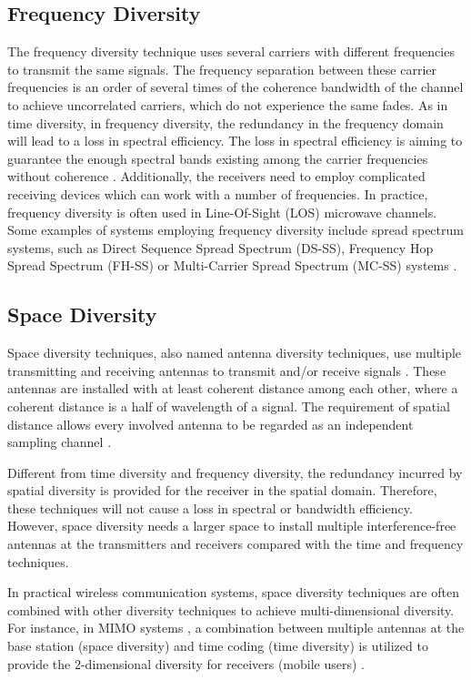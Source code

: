 \subsection{Frequency Diversity}
The frequency diversity technique uses several carriers with
different frequencies to transmit the same signals. The frequency
separation between these carrier frequencies is an order of several
times of the coherence bandwidth of the channel to achieve
uncorrelated carriers, which do not experience the same fades. As in
time diversity, in frequency diversity, the redundancy in the
frequency domain will lead to a loss in spectral efficiency. The
loss in spectral efficiency is aiming to guarantee the enough
spectral bands existing among the carrier frequencies without
coherence \cite{23}. Additionally, the receivers need to employ
complicated receiving devices which can work with a number of
frequencies. In practice, frequency diversity is often used in
Line-Of-Sight (LOS) microwave channels. Some examples of systems
employing frequency diversity include spread spectrum systems, such
as Direct Sequence Spread Spectrum (DS-SS), Frequency Hop Spread
Spectrum (FH-SS) or Multi-Carrier Spread Spectrum (MC-SS) systems
\cite{10}.

\subsection{ Space Diversity}
Space diversity techniques, also named antenna diversity techniques,
use multiple transmitting and receiving antennas to transmit and/or
receive signals \cite{3}. These antennas are installed with at least
coherent distance among each other, where a coherent distance is a
half of wavelength of a signal. The requirement of spatial distance
allows every involved antenna to be regarded as an independent
sampling channel \cite{26}.

Different from time diversity and frequency diversity, the
redundancy incurred by spatial diversity is provided for the
receiver in the spatial domain. Therefore, these techniques will not
cause a loss in spectral or bandwidth efficiency. However, space
diversity needs a larger space to install multiple interference-free
antennas at the transmitters and receivers compared with the time
and frequency techniques.

In practical wireless communication systems, space diversity
techniques are often combined with other diversity techniques to
achieve multi-dimensional diversity. For instance, in MIMO systems
\cite{3}, a combination between multiple antennas at the base
station (space diversity) and time coding (time diversity) is
utilized to provide the 2-dimensional diversity for receivers
(mobile users) \cite{10}.

